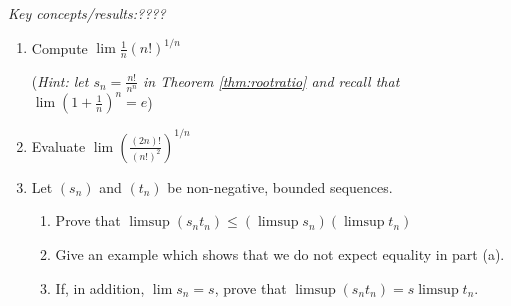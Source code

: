 \begin{exercises}{}{}
	\emph{Key concepts/results:\quad ????}
	
	\begin{enumerate}
  	\item Compute $\lim \frac 1n(n!)^{1/n}$\par
		(\emph{Hint: let $s_n=\frac{n!}{n^n}$ in Theorem \ref{thm:rootratio} and recall that $\lim\left(1+\frac 1n\right)^n=e$})
  
  	\item Evaluate $\lim\left(\frac{(2n)!}{(n!)^2}\right)^{1/n}$
  
  	\item\label{exs:limsupprod} Let $(s_n)$ and $(t_n)$ be non-negative, bounded sequences.
		\begin{enumerate}
			\item Prove that $\limsup(s_nt_n)\le\left(\limsup s_n\right)\left(\limsup t_n\right)$
			\item Give an example which shows that we do not expect equality in part (a).
			\item If, in addition, $\lim s_n=s$, prove that $\limsup(s_nt_n)=s\limsup t_n$.
		\end{enumerate}
% 	


\end{enumerate}
\end{exercises}
